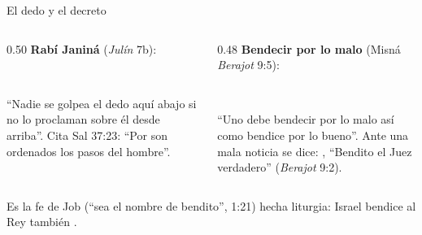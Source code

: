 \begin{frame}{El dedo y el decreto}
\begin{columns}[t,onlytextwidth]
\begin{column}{0.50\textwidth}\small
\textbf{Rabí Janiná} (\emph{Julín} 7b):
\begin{center}\\ \end{center}
``Nadie se golpea el dedo aquí abajo si no lo proclaman sobre él desde arriba''. Cita Sal 37:23: ``Por \SENOR{} son ordenados los pasos del hombre''.
\end{column}
\begin{column}{0.48\textwidth}\small
\textbf{Bendecir por lo malo} (Misná \emph{Berajot} 9:5):
\begin{center}\\ \end{center}
``Uno debe bendecir por lo malo así como bendice por lo bueno''. Ante una mala noticia se dice: , ``Bendito el Juez verdadero'' (\emph{Berajot} 9:2).
\end{column}
\end{columns}\par\smallskip
\begin{tcolorbox}[colback=papiro,colframe=dorado,boxrule=1.2pt,arc=3pt]
\small Es la fe de Job (``sea el nombre de \SENOR{} bendito'', 1:21) hecha liturgia: Israel bendice al Rey también .
\end{tcolorbox}
\end{frame}

